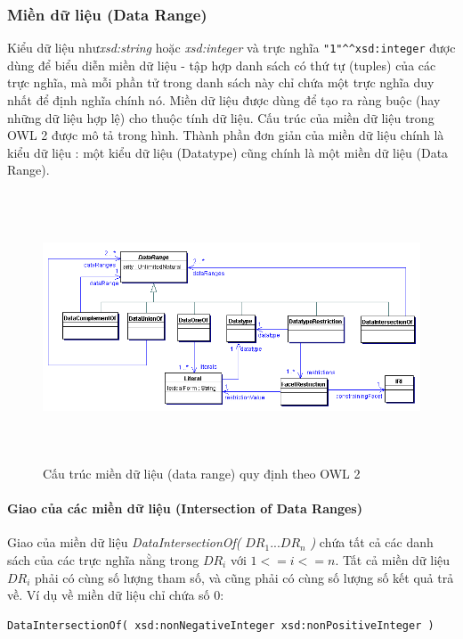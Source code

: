 \subsubsection{Miền dữ liệu (Data Range)}
Kiểu dữ liệu như\textit{xsd:string} hoặc \textit{xsd:integer} và trực nghĩa \verb|"1"^^xsd:integer| được dùng để biểu diễn miền dữ liệu - tập hợp danh sách có thứ tự (tuples) của các trực nghĩa, mà mỗi phần tử trong danh sách này chỉ chứa một trực nghĩa duy nhất để định nghĩa chính nó. Miền dữ liệu được dùng để tạo ra ràng buộc (hay những dữ liệu hợp lệ) cho thuộc tính dữ liệu. Cấu trúc của miền dữ liệu trong OWL 2 được mô tả trong hình. Thành phần đơn giản của miền dữ liệu chính là kiểu dữ liệu : một kiểu dữ liệu (Datatype) cũng chính là một miền dữ liệu (Data Range).
\begin{figure}[h!]
	\centering
	\includegraphics[width=150mm, height=80mm]{Figures/datarange.png}
	\caption{Cấu trúc miền dữ liệu (data range) quy định theo OWL 2\label{overflow}}
\end{figure}

\paragraph{Giao của các miền dữ liệu (Intersection of Data Ranges)}
Giao của miền dữ liệu \textit{DataIntersectionOf(} $DR_{1} ... DR_{n}$ \textit{)}  chứa tất cả các danh sách của các trực nghĩa nằng trong $DR_{i}$ với $1 <= i <= n$. Tất cả miền dữ liệu $DR_{i}$ phải có cùng số lượng tham số, và cũng phải có cùng số lượng số kết quả trả về. Ví dụ về miền dữ liệu chỉ chứa số 0:
\begin{verbatim}
DataIntersectionOf( xsd:nonNegativeInteger xsd:nonPositiveInteger )
\end{verbatim}

